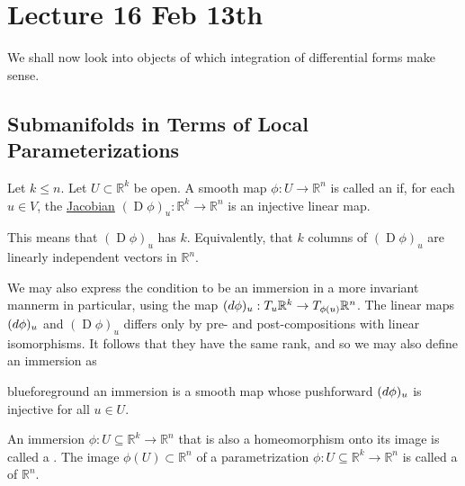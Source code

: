 \documentclass[notoc,notitlepage]{tufte-book}
\DeclareMathOperator{\D}{D}
\begin{document}
\chapter{Lecture 16 Feb 13th}%
\label{chp:lecture_16_feb_13th}

We shall now look into objects of which integration of differential
forms make sense.

\section{Submanifolds in Terms of Local Parameterizations}%
\label{sec:submanifolds_in_terms_of_local_parameterizations}

\begin{defn}[Immersion]\label{defn:immersion}
  Let $k \leq n$. Let $U \subset \mathbb{R}^k$ be open. A smooth map $\phi : U
  \to \mathbb{R}^n$ is called an  if, for each $u \in V$, the
  \hyperref[defn:differential]{Jacobian} $(\D \phi)_u : \mathbb{R}^k \to
  \mathbb{R}^n$ is an injective linear map.
\end{defn}

\begin{note}
  This means that $(\D \phi)_u$ has  $k$. Equivalently,
  that $k$ columns of $(\D \phi)_u$ are linearly independent vectors in
  $\mathbb{R}^n$.

  We may also express the condition to be an immersion in a more invariant
  mannerm in particular, using the   map $(\mathop{}\!d{\phi})_u : T_u
  \mathbb{R}^k \to T_{\phi(u)} \mathbb{R}^n$. The linear maps $(\mathop{}\!d{\phi})_u$
  and $(\D \phi)_u$ differs only by pre- and post-compositions with linear
  isomorphisms. It follows that they have the same rank, and so we may also
  define an immersion as
  \begin{quotebox}{blue}{foreground}
    an immersion is a smooth map whose pushforward $(\mathop{}\!d{\phi})_u$ is injective
    for all $u \in U$.
  \end{quotebox}
\end{note}

\begin{defn}\label{defn:parametrizations_and_parametrized_submanifolds}
  An immersion $\phi : U \subseteq \mathbb{R}^k \to \mathbb{R}^n$ that is also a
  homeomorphism onto its image is called a . The image
  $\phi(U) \subset \mathbb{R}^n$ of a parametrization $\phi : U \subseteq
  \mathbb{R}^k \to \mathbb{R}^n$ is called a  of $\mathbb{R}^n$.
\end{defn}
\end{document}
